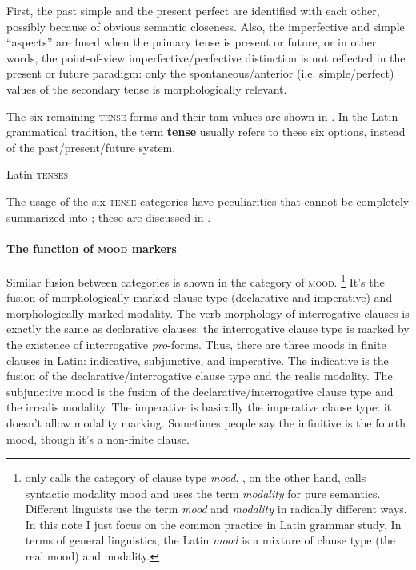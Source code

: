 \documentclass[a4paper, oneside, 12pt]{report}
\newcommand*{\concept}[1]{\textbf{#1}}
\newcommand*{\term}[1]{\emph{#1}}
\newcommand*{\category}[1]{\textsc{#1}}
\begin{document}
First, the past simple and the present perfect are identified with each other,
possibly because of obvious semantic closeness.
Also, the imperfective and simple ``aspects'' are fused 
when the primary tense is present or future,
or in other words, the point-of-view imperfective/perfective distinction is not reflected
in the present or future paradigm:
only the spontaneous/anterior (i.e. simple/perfect) values of the secondary tense is morphologically relevant.

The six remaining \category{tense} forms and their \ac{tam} values
are shown in .
In the Latin grammatical tradition, 
the term \concept{tense} 
usually refers to these six options,
instead of the past/present/future system.

\begin{table}[H]
    \caption{Latin \category{tenses}}
    \label{tbl:latin-tense-aspect}
    \centering
        
\end{table}

The usage of the six \category{tense} categories have peculiarities
that cannot be completely summarized into ;
these are discussed in .

\paragraph*{The function of \category{mood} markers}
Similar fusion between categories is shown in the category of \category{mood}.%
\footnote{
    \citet{dixon2009basic1} only calls the category of clause type \term{mood}.
    \citet{cgel}, on the other hand, 
    calls syntactic modality mood 
    and uses the term \term{modality} for pure semantics.
    Different linguists use the term \term{mood} and \term{modality} in radically different ways.
    In this note I just focus on the common practice in Latin grammar study.
    In terms of general linguistics, 
    the Latin \term{mood} is a mixture of clause type (the real mood)
    and modality.
}
It's the fusion of morphologically marked clause type 
(declarative and imperative)
and morphologically marked modality.
The verb morphology of interrogative clauses is exactly the same as declarative clauses:
the interrogative clause type is marked by the existence of interrogative \term{pro}-forms.
Thus, there are three moods in finite clauses in Latin:
\acl{indicative}, \acl{subjunctive}, and \acl{imperative}.
The \acl{indicative} is the fusion of 
the declarative/interrogative clause type and the realis modality.
The \acl{subjunctive} mood is the fusion of 
the declarative/interrogative clause type and the irrealis modality.
The \acl{imperative} is basically the imperative clause type:
it doesn't allow modality marking.
Sometimes people say the infinitive is the fourth mood,
though it's a non-finite clause.
\end{document}
